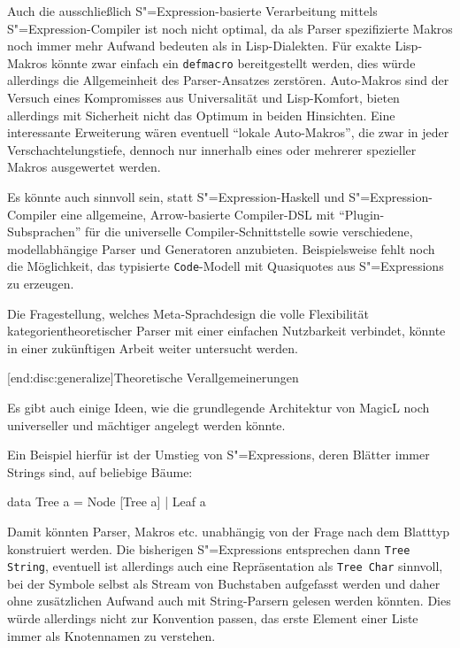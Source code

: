 \documentclass[11pt, a4paper, bibgerm]{scrbook}
\newenvironment{DIFnomarkup}{}{}
\newcommand\icode[1]{\lstinline?#1?}
\newcommand\lsubsection{}
\newcommand{\sexp}{S"=Expression}
\newcommand{\sexps}{S"=Expressions}
\begin{document}
Auch die ausschließlich \sexp{}-basierte Verarbeitung mittels
\sexp{}-Compiler ist noch nicht optimal, da als Parser spezifizierte
Makros noch immer mehr Aufwand bedeuten als in Lisp-Dialekten. Für
exakte Lisp-Makros könnte zwar einfach ein \icode{defmacro}
bereitgestellt werden, dies würde allerdings die Allgemeinheit des
Parser-Ansatzes zerstören. Auto-Makros sind der Versuch eines
Kompromisses aus Universalität und Lisp-Komfort, bieten allerdings mit
Sicherheit nicht das Optimum in beiden Hinsichten. Eine interessante
Erweiterung wären eventuell ``lokale Auto-Makros'', die zwar in jeder
Verschachtelungstiefe, dennoch nur innerhalb eines oder mehrerer
spezieller Makros ausgewertet werden. 

Es könnte auch sinnvoll sein, statt \sexp{}-Haskell und \sexp{}-Compiler
eine allgemeine, Arrow-basierte Compiler-DSL mit ``Plugin-Subsprachen''
für die universelle Compiler-Schnittstelle sowie verschiedene,
modellabhängige Parser und Generatoren anzubieten. Beispielsweise fehlt
noch die Möglichkeit, das typisierte \icode{Code}-Modell mit Quasiquotes
aus \sexps{} zu erzeugen.

Die Fragestellung, welches Meta-Sprachdesign die volle Flexibilität
kategorientheoretischer Parser mit einer einfachen Nutzbarkeit
verbindet, könnte in einer zukünftigen Arbeit weiter untersucht werden.

\lsubsection[end:disc:generalize]{Theoretische Verallgemeinerungen}

Es gibt auch einige Ideen, wie die grundlegende Architektur von MagicL
noch universeller und mächtiger angelegt werden könnte.

Ein Beispiel hierfür ist der Umstieg von \sexps{}, deren Blätter immer
Strings sind, auf beliebige Bäume:
\begin{DIFnomarkup}\begin{code}
data Tree a = Node [Tree a]
            | Leaf a
\end{code}\end{DIFnomarkup}
Damit könnten Parser, Makros etc. unabhängig von der Frage nach dem
Blatttyp konstruiert werden. Die bisherigen \sexps{} entsprechen dann
\icode{Tree String}, eventuell ist allerdings auch eine Repräsentation
als \icode{Tree Char} sinnvoll, bei der Symbole selbst als Stream von
Buchstaben aufgefasst werden und daher ohne zusätzlichen Aufwand auch
mit String-Parsern gelesen werden könnten. Dies würde allerdings nicht
zur Konvention passen, das erste Element einer Liste immer als
Knotennamen zu verstehen.
\end{document}
